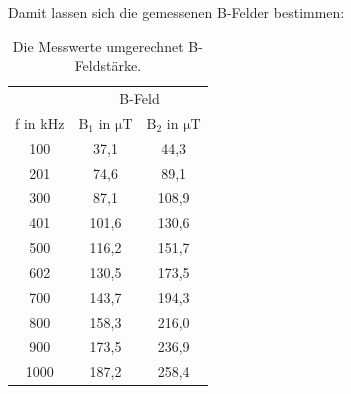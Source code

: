 \documentclass[
  bibliography=totoc,     %
  captions=tableheading,  %
  titlepage=firstiscover, %
]{scrartcl}
\begin{document}
Damit lassen sich die gemessenen B-Felder bestimmen:
\begin{table}[H]
  \centering
  \caption{Die Messwerte umgerechnet B-Feldstärke.}
  \label{tab:3}
  \begin{tabular}{c c c}
    \toprule
     & \multicolumn{2}{c}{B-Feld}\\
    f in \si{\kilo\hertz} & $\mathup{B}_\mathup{1}$ in $\si{\micro\tesla}$ & $\mathup{B}_\mathup{2}$ in $\si{\micro\tesla}$ \\
    \midrule
    100  &  37,1 &  44,3 \\
    201  &  74,6 &  89,1 \\
    300  &  87,1 & 108,9 \\
    401  & 101,6 & 130,6 \\
    500  & 116,2 & 151,7 \\
    602  & 130,5 & 173,5 \\
    700  & 143,7 & 194,3 \\
    800  & 158,3 & 216,0 \\
    900  & 173,5 & 236,9 \\
    1000 & 187,2 & 258,4 \\
    \bottomrule
  \end{tabular}
\end{table}
\end{document}
